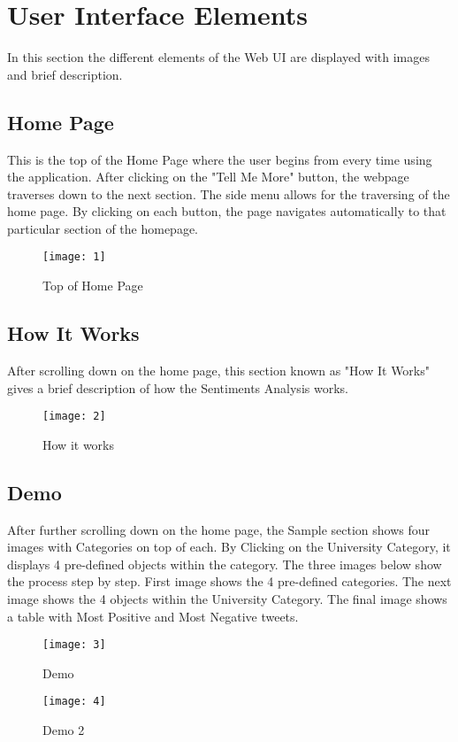\documentclass[12pt, titlepage]{article}
\begin{document}
\newpage
\section{User Interface Elements}
In this section the different elements of the Web UI are displayed with images and brief description.
\subsection{Home Page}
This is the top of the Home Page where the user begins from every time using the application. After clicking on the "Tell Me More" button, the webpage traverses down to the next section. The side menu allows for the traversing of the home page. By clicking on each button, the page navigates automatically to that particular section of the homepage. 

\begin{figure}[H]
\centering
\texttt{[image: 1]}
\caption{Top of Home Page}
\label{fig:Result}
\end{figure}


\subsection{How It Works}
After scrolling down on the home page, this section known as "How It Works" gives a brief description of how the Sentiments Analysis works.
\begin{figure}[H]
\centering
\texttt{[image: 2]}
\caption{How it works}
\label{fig:Result}
\end{figure}

\subsection{Demo}
After further scrolling down on the home page, the Sample section shows four images with Categories on top of each. By Clicking on the University Category, it displays 4 pre-defined objects within the category. The three images below show the process step by step. First image shows the 4 pre-defined categories. The next image shows the 4 objects within the University Category. The final image shows a table with Most Positive and Most Negative tweets.
\begin{figure}[H]
\centering
\texttt{[image: 3]}
\caption{Demo}
\label{fig:Result}
\end{figure}

\begin{figure}[H]
\centering
\texttt{[image: 4]}
\caption{Demo 2}
\label{fig:Result}
\end{figure}
\end{document}
